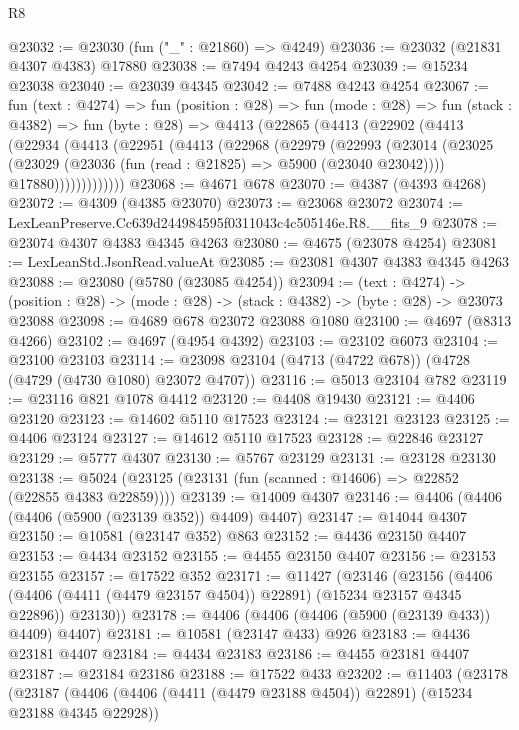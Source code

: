 \begin{lexlean}{R8}
\begin{coremodule}
@23032 := @23030 (fun ("_" : @21860) => @4249)
@23036 := @23032 (@21831 @4307 @4383) @17880
@23038 := @7494 @4243 @4254
@23039 := @15234 @23038
@23040 := @23039 @4345
@23042 := @7488 @4243 @4254
@23067 := fun (text : @4274) =>
  fun (position : @28) =>
  fun (mode : @28) =>
  fun (stack : @4382) =>
  fun (byte : @28) =>
  @4413
    (@22865
      (@4413
        (@22902
          (@4413
            (@22934
              (@4413
                (@22951
                  (@4413
                    (@22968
                      (@22979
                        (@22993
                          (@23014
                            (@23025
                              (@23029 (@23036 (fun (read : @21825) => @5900 (@23040 @23042))))
                              @17880)))))))))))))
@23068 := @4671 @678
@23070 := @4387 (@4393 @4268)
@23072 := @4309 (@4385 @23070)
@23073 := @23068 @23072
@23074 := LexLeanPreserve.Cc639d244984595f0311043c4c505146e.R8.__fits_9
@23078 := @23074 @4307 @4383 @4345 @4263
@23080 := @4675 (@23078 @4254)
@23081 := LexLeanStd.JsonRead.valueAt
@23085 := @23081 @4307 @4383 @4345 @4263
@23088 := @23080 (@5780 (@23085 @4254))
@23094 := (text : @4274) ->
  (position : @28) -> (mode : @28) -> (stack : @4382) -> (byte : @28) -> @23073 @23088
@23098 := @4689 @678 @23072 @23088 @1080
@23100 := @4697 (@8313 @4266)
@23102 := @4697 (@4954 @4392)
@23103 := @23102 @6073
@23104 := @23100 @23103
@23114 := @23098 @23104 (@4713 (@4722 @678)) (@4728 (@4729 (@4730 @1080) @23072 @4707))
@23116 := @5013 @23104 @782
@23119 := @23116 @821 @1078 @4412
@23120 := @4408 @19430
@23121 := @4406 @23120
@23123 := @14602 @5110 @17523
@23124 := @23121 @23123
@23125 := @4406 @23124
@23127 := @14612 @5110 @17523
@23128 := @22846 @23127
@23129 := @5777 @4307
@23130 := @5767 @23129
@23131 := @23128 @23130
@23138 := @5024 (@23125 (@23131 (fun (scanned : @14606) => @22852 (@22855 @4383 @22859))))
@23139 := @14009 @4307
@23146 := @4406 (@4406 (@4406 (@5900 (@23139 @352)) @4409) @4407)
@23147 := @14044 @4307
@23150 := @10581 (@23147 @352) @863
@23152 := @4436 @23150 @4407
@23153 := @4434 @23152
@23155 := @4455 @23150 @4407
@23156 := @23153 @23155
@23157 := @17522 @352
@23171 := @11427
    (@23146
      (@23156
        (@4406 (@4406 (@4411 (@4479 @23157 @4504)) @22891) (@15234 @23157 @4345 @22896))
        @23130))
@23178 := @4406 (@4406 (@4406 (@5900 (@23139 @433)) @4409) @4407)
@23181 := @10581 (@23147 @433) @926
@23183 := @4436 @23181 @4407
@23184 := @4434 @23183
@23186 := @4455 @23181 @4407
@23187 := @23184 @23186
@23188 := @17522 @433
@23202 := @11403
    (@23178
      (@23187
        (@4406 (@4406 (@4411 (@4479 @23188 @4504)) @22891) (@15234 @23188 @4345 @22928))

\end{coremodule}
\end{lexlean}
